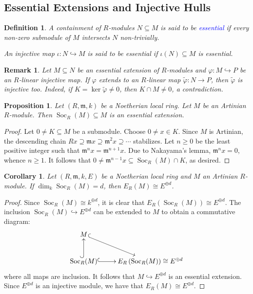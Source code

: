 \documentclass[10pt]{article}
\theoremstyle{thmstyle}
\newtheorem{proposition}[theorem]{Proposition}
\theoremstyle{defstyle}
\newtheorem{definition}[theorem]{Definition}
\newtheorem{corollary}[theorem]{Corollary}
\newtheorem{remark}[theorem]{Remark}
\newcommand{\frakm}{\mathfrak{m}} %
\newcommand{\wt}[1]{\widetilde{#1}}
\newcommand{\into}{\hookrightarrow}
\newcommand{\define}[1]{\textcolor{blue}{\textit{#1}}}
\renewcommand{\ge}{\geqslant}
\newcommand{\Soc}{\operatorname{Soc}}
\begin{document}
\subsection{Essential Extensions and Injective Hulls}

\begin{definition}
    A containment of $R$-modules $N\subseteq M$ is said to be \define{essential} if every non-zero submodule of $M$ intersects $N$ non-trivially.

    An injective map $\iota: N\into M$ is said to be essential if $\iota(N)\subseteq M$ is essential.
\end{definition}

\begin{remark}
    Let $M\subseteq N$ be an essential extension of $R$-modules and $\varphi: M\into P$ be an $R$-linear injective map. If $\varphi$ extends to an $R$-linear map $\wt\varphi: N\to P$, then $\wt\varphi$ is injective too. Indeed, if $K = \ker\wt\varphi\ne 0$, then $K\cap M\ne 0$, a contradiction.
\end{remark}

\begin{proposition}
    Let $(R,\frakm, k)$ be a Noetherian local ring. Let $M$ be an Artinian $R$-module. Then $\Soc_R(M)\subseteq M$ is an essential extension.
\end{proposition}
\begin{proof}
    Let $0\ne K\subseteq M$ be a submodule. Choose $0\ne x\in K$. Since $M$ is Artinian, the descending chain $Rx\supseteq\frakm x\supseteq\frakm^2 x\supseteq\cdots$ stabilizes. Let $n\ge 0$ be the least positive integer such that $\frakm^n x = \frakm^{n + 1}x$. Due to Nakayama's lemma, $\frakm^n x = 0$, whence $n\ge 1$. It follows that $0\ne\frakm^{n  - 1}x\subseteq\Soc_R(M)\cap K$, as desired.
\end{proof}

\begin{corollary}
    Let $(R,\frakm, k, E)$ be a Noetherian local ring and $M$ an Artinian $R$-module. If $\dim_k\Soc_R(M) = d$, then $E_R(M)\cong E^{\oplus d}$.
\end{corollary}
\begin{proof}
    Since $\Soc_R(M)\cong k^{\oplus d}$, it is clear that $E_R\left(\Soc_R(M)\right)\cong E^{\oplus d}$. The inclusion $\Soc_R(M)\into E^{\oplus d}$ can be extended to $M$ to obtain a commutative diagram:
    \begin{equation*}
        \xymatrix {
            M\ar@{^{(}->}[rd]\\
            \Soc_R(M)\ar@{^{(}->}[r]\ar@{^{(}->}[u] & E_R\left(\Soc_R(M)\right)\cong E^{\oplus d}
        }
    \end{equation*}
    where all maps are inclusion. It follows that $M\into E^{\oplus d}$ is an essential extension. Since $E^{\oplus d}$ is an injective module, we have that $E_R(M)\cong E^{\oplus d}$.
\end{proof}
\end{document}
